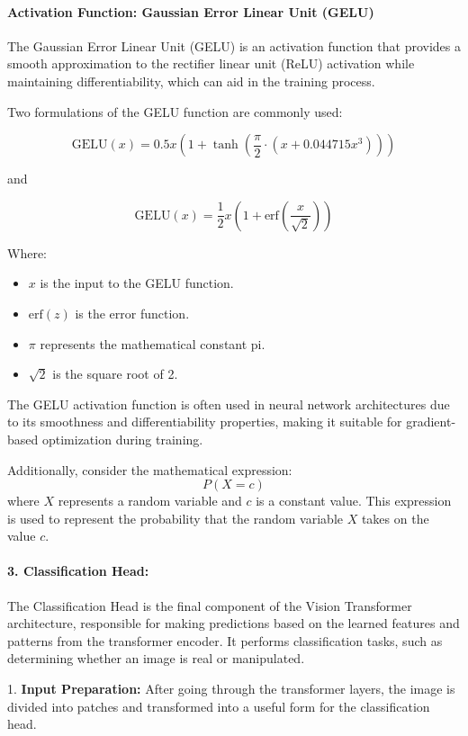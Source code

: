 \paragraph{Activation Function: Gaussian Error Linear Unit (GELU)}
The Gaussian Error Linear Unit (GELU) is an activation function that provides a smooth approximation to the rectifier linear unit (ReLU) activation while maintaining differentiability, which can aid in the training process.

\noindent Two formulations of the GELU function are commonly used:

\[
    \text{GELU}(x) = 0.5x \left(1 + \tanh\left(\frac{\pi}{2} \cdot \left(x + 0.044715x^3\right)\right)\right)
\]

and

\[
    \text{GELU}(x) = \frac{1}{2}x \left(1 + \text{erf}\left(\frac{x}{\sqrt{2}}\right)\right)
\]

Where:
\begin{itemize}
    \item $x$ is the input to the GELU function.
    \item $\text{erf}(z)$ is the error function.
    \item $\pi$ represents the mathematical constant pi.
    \item $\sqrt{2}$ is the square root of 2.
\end{itemize}

The GELU activation function is often used in neural network architectures due to its smoothness and differentiability properties, making it suitable for gradient-based optimization during training.

\noindent Additionally, consider the mathematical expression:
\[
    P(X = c)
\]
where $X$ represents a random variable and $c$ is a constant value. This expression is used to represent the probability that the random variable $X$ takes on the value $c$.




\paragraph{3. Classification Head:}
The Classification Head is the final component of the Vision Transformer architecture, responsible for making predictions based on the learned features and patterns from the transformer encoder. It performs classification tasks, such as determining whether an image is real or manipulated.


1. \textbf{Input Preparation:} After going through the transformer layers, the image is divided into patches and transformed into a useful form for the classification head.

